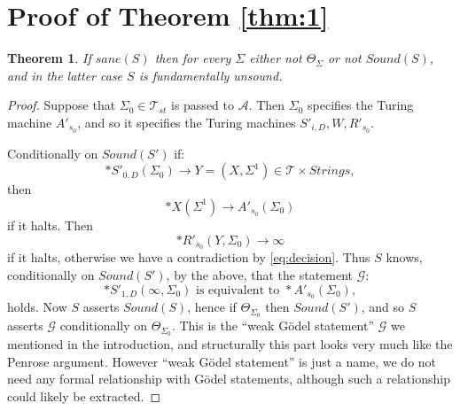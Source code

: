\documentclass[9pt,twocolumn,twoside,lineno]{pnas-new}
\numberwithin{equation}{section}
\newtheorem{theorem}{Theorem}
\theoremstyle{definition}
\theoremstyle{remark}
\begin{document}
\section {Proof of Theorem \ref{thm:1}}   
\begin{theorem} \label{thm:2} If $sane (S)$ then for every $\Sigma$ either not $\Theta _{\Sigma} $ or not $Sound (S)$, and in the latter case $S$ is fundamentally unsound.
\end{theorem}
\begin{proof}
Suppose that $\Sigma _{0} \in \mathcal{T} _{st} $ is passed to $\mathcal{A} $.
Then  $\Sigma _{0}    $  specifies the Turing machine $A' _{s _{0} } $, and so it specifies the Turing machines $S' _{i,D}, W, R' _{s _{0} } $.  

Conditionally on $Sound (S')$
      if:
   \begin{equation} \label{eq:4} 
   *S'   _{0,D} (\Sigma _{0}    ) \to Y =(X, \Sigma ^{1}) \in \mathcal{T} \times Strings,
\end{equation} 
then $$*X   (\Sigma ^{1}) \to A' _{s _{0} }  (\Sigma _{0}   )$$ if it halts. 
Then  $$*R' _{s _{0} }  (Y, \Sigma _{0} ) \to \infty$$ if it halts, otherwise we have a contradiction by \eqref{eq:decision}. Thus $S$ knows, conditionally on $Sound (S') $, by the above, that the statement $\mathcal{G}$:
\begin{equation} \label{eq:AS} *S' _{1,D} (\infty, \Sigma _{0} ) \text{ is equivalent to } *A' _{s _{0} }  (\Sigma _{0}),
\end{equation}
holds.
 Now  $S$ asserts $Sound (S)$, hence if $\Theta _{\Sigma _{0} } $ then $Sound (S') $, and so $S$ asserts $\mathcal{G}$ conditionally on $\Theta _{\Sigma _{0} } $. This is the ``weak G\"odel statement'' $\mathcal{G}$ we mentioned in the introduction, and structurally this part looks very much like the Penrose argument.
   However ``weak G\"odel statement'' is  just a name, we do not need any formal relationship with G\"odel statements, although such a relationship could likely be extracted.  



\end{proof}
\end{document}
